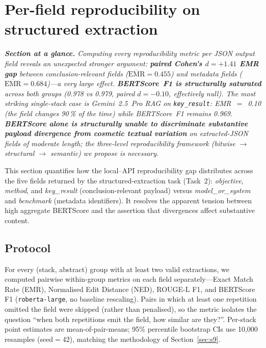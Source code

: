 \documentclass[11pt]{article}
\begin{document}
\section{Per-field reproducibility on structured extraction}\label{sec:s10b}

\textit{\textbf{Section at a glance.} Computing every reproducibility metric \emph{per JSON output field} reveals an unexpected stronger argument: \textbf{paired Cohen's $d = +1.41$ EMR gap} between conclusion-relevant fields ($\overline{\text{EMR}} = 0.455$) and metadata fields ($\overline{\text{EMR}} = 0.684$)---a very large effect. \textbf{BERTScore~F1 is structurally saturated} across both groups (0.978 vs 0.979, paired $d = -0.10$, effectively null). The most striking single-stack case is Gemini~2.5~Pro RAG on \texttt{key\_result}: EMR~$=$~0.10 (the field changes 90\,\% of the time) while BERTScore~F1 remains 0.969. \textbf{BERTScore alone is structurally unable to discriminate substantive payload divergence from cosmetic textual variation} on extracted-JSON fields of moderate length; the three-level reproducibility framework (bitwise $\to$ structural $\to$ semantic) we propose is necessary.}

This section quantifies how the local--API reproducibility gap distributes across the five fields returned by the structured-extraction task (Task~2): \emph{objective}, \emph{method}, and \emph{key\_result} (conclusion-relevant payload) versus \emph{model\_or\_system} and \emph{benchmark} (metadata identifiers). It resolves the apparent tension between high aggregate BERTScore and the assertion that divergences affect substantive content.

\subsection{Protocol}

For every (stack, abstract) group with at least two valid extractions, we computed pairwise within-group metrics on each field separately---Exact Match Rate (EMR), Normalised Edit Distance (NED), ROUGE-L F1, and BERTScore F1 (\texttt{roberta-large}, no baseline rescaling). Pairs in which at least one repetition omitted the field were skipped (rather than penalised), so the metric isolates the question ``when both repetitions emit the field, how similar are they?''. Per-stack point estimates are mean-of-pair-means; 95\% percentile bootstrap CIs use 10{,}000 resamples (seed${=}$42), matching the methodology of Section~\ref{sec:s9}.
\end{document}
